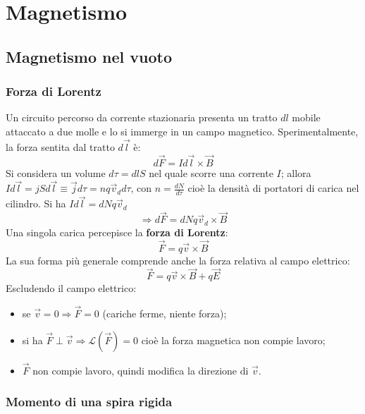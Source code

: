 \documentclass[a4paper]{scrartcl}
\numberwithin{equation}{subsection}
\theoremstyle{style1}
\begin{document}
\newpage

\section{Magnetismo}

\subsection{Magnetismo nel vuoto}

\subsubsection{Forza di Lorentz}


Un circuito percorso da corrente stazionaria presenta un tratto $dl$ mobile attaccato a due molle e lo si immerge in un campo magnetico. Sperimentalmente, la forza sentita dal tratto $d\vec{l}$ \`e:
\begin{equation}
	d\vec{F} = Id \vec{l}\times \vec{B}
\end{equation}
Si considera un volume $d\tau  = dl S$ nel quale scorre una corrente $I$; allora $I d\vec{l} = jS d\vec{l} \equiv \vec{j}d\tau = nq \vec{v}_d d\tau $, con $n=\frac{dN}{d\tau }$ cio\`e la densit\`a di portatori di carica nel cilindro. Si ha $Id\vec{l} = dN q\vec{v}_d$
\begin{equation}
	\Rightarrow d\vec{F} = dN q\vec{v}_d \times \vec{B}
\end{equation}
Una singola carica percepisce la \textbf{forza di Lorentz}:
\begin{equation}
	\vec{F} = q\vec{v}\times \vec{B}
\end{equation}
La sua forma pi\`u generale comprende anche la forza relativa al campo elettrico:
\begin{equation}
	\vec{F} = q\vec{v} \times \vec{B}  + q \vec{E}
\end{equation}
Escludendo il campo elettrico:
\begin{itemize}
	\item se $\vec{v}= 0 \Rightarrow \vec{F} = 0$ (cariche ferme, niente forza);
	\item si ha $\vec{F}\perp \vec{v}\Rightarrow \mathcal{L}(\vec{F}) = 0$ cio\`e la forza magnetica non compie lavoro;
	\item $\vec{F}$ non compie lavoro, quindi modifica la direzione di $\vec{v}$.
\end{itemize}
\subsubsection{Momento di una spira rigida}
\end{document}
